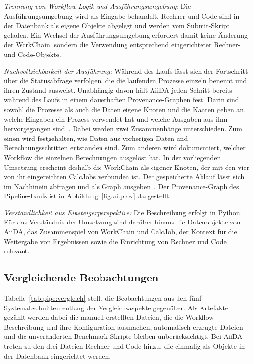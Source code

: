 \emph{Trennung von Workflow-Logik und Ausführungsumgebung:} Die
Ausführungsumgebung wird als Eingabe behandelt. Rechner und Code sind
in der Datenbank als eigene Objekte abgelegt und werden vom
Submit-Skript geladen. Ein Wechsel der Ausführungsumgebung erfordert
damit keine Änderung der WorkChain, sondern die Verwendung
entsprechend eingerichteter Rechner- und Code-Objekte.


\emph{Nachvollziehbarkeit der Ausführung:} Während des Laufs lässt
sich der Fortschritt über die Statusabfrage verfolgen, die die
laufenden Prozesse einzeln benennt und ihren Zustand ausweist. Unabhängig davon hält AiiDA jeden Schritt bereits während des Laufs in einem dauerhaften
Provenance-Graphen fest. Darin sind sowohl die Prozesse als auch die
Daten eigene Knoten und die Kanten geben an, welche Eingaben ein
Prozess verwendet hat und welche Ausgaben aus ihm hervorgegangen
sind~\cite[S.~7\,f.]{huber2020aiida}. Dabei werden zwei Zusammenhänge unterschieden. Zum einen wird festgehalten, wie Daten aus vorherigen Daten und Berechnungsschritten entstanden sind. Zum anderen wird dokumentiert, welcher Workflow die einzelnen Berechnungen ausgelöst hat. In der vorliegenden Umsetzung erscheint deshalb die WorkChain als
eigener Knoten, der mit den vier von ihr eingereichten CalcJobs
verbunden ist. Der gespeicherte Ablauf lässt sich im
Nachhinein abfragen und als Graph ausgeben~\cite{aiidadocs-graph}. Der
Provenance-Graph des Pipeline-Laufs ist in
Abbildung~\ref{fig:ai:prov} dargestellt.

\emph{Verständlichkeit aus Einsteigerperspektive:} Die Beschreibung
erfolgt in Python. Für das Verständnis der Umsetzung sind darüber hinaus die
Datenobjekte von AiiDA, das Zusammenspiel von WorkChain und CalcJob,
der Kontext für die Weitergabe von Ergebnissen sowie die Einrichtung
von Rechner und Code relevant.

\subsection{Vergleichende Beobachtungen}
\label{sec:lokal:pipeline:zusammenfassung}

Tabelle~\ref{tab:pipe:vergleich} stellt die Beobachtungen aus den
fünf Systemabschnitten entlang der Vergleichsaspekte gegenüber. Als
Artefakte gezählt werden dabei die manuell erstellten Dateien, die
die Workflow-Beschreibung und ihre Konfiguration ausmachen,
automatisch erzeugte Dateien und die unveränderten Benchmark-Skripte
bleiben unberücksichtigt. Bei AiiDA treten zu den drei Dateien
Rechner und Code hinzu, die einmalig als Objekte in der Datenbank
eingerichtet werden.

